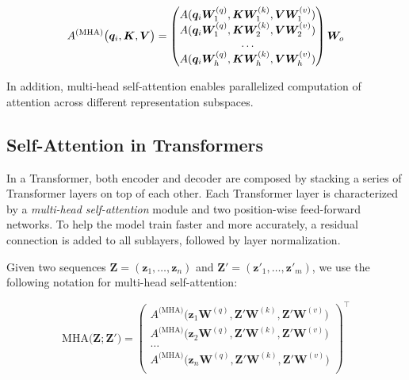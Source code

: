\begin{equation}
    A^{\textrm{(MHA)}}\bigl(\bm{q}_i, \bm{K}, \bm{V}\bigr) = 
    \begin{pmatrix}
        A(\bm{q}_i \bm{W}^{(q)}_1, \bm{K}\bm{W}^{(k)}_1, \bm{V}\bm{W}^{(v)}_1) \\
        A(\bm{q}_i \bm{W}^{(q)}_1, \bm{K}\bm{W}^{(k)}_2, \bm{V}\bm{W}^{(v)}_2) \\
        \ldots \\
        A(\bm{q}_i \bm{W}^{(q)}_h, \bm{K}\bm{W}^{(k)}_h, \bm{V}\bm{W}^{(v)}_h)
    \end{pmatrix}
    \bm{W}_o \\
\end{equation}
    

\noindent In addition, multi-head self-attention enables parallelized computation of attention across different representation subspaces.

 
\subsection{Self-Attention in Transformers}

In a Transformer, both encoder and decoder are composed by stacking a series of Transformer layers on top of each other. Each Transformer layer is characterized by a \textit{multi-head self-attention} module and two position-wise feed-forward networks. To help the model train faster and more accurately, a residual connection \citep{he2016deep} is added to all sublayers, followed by layer normalization.

Given two sequences $\bm{Z} = (\bm{z}_1, \ldots, \bm{z}_n)$ and $\bm{Z'} = (\bm{z'}_1, \ldots, \bm{z'}_m)$, we use the following notation for multi-head self-attention:

\begin{equation}
    \textrm{MHA}\bigl(\bm{Z}; \bm{Z'}\bigr) = 
    {\begin{pmatrix}
    A^{\textrm{(MHA)}}\bigl(\bm{z}_1 \bm{W}^{(q)}, \bm{Z'}\bm{W}^{(k)}, \bm{Z}'\bm{W}^{(v)}\bigr)\\ 
    A^{\textrm{(MHA)}}\bigl(\bm{z}_2 \bm{W}^{(q)}, \bm{Z'}\bm{W}^{(k)}, \bm{Z}'\bm{W}^{(v)}\bigr)\\ 
    \ldots \\
    A^{\textrm{(MHA)}}\bigl(\bm{z}_n \bm{W}^{(q)}, \bm{Z'}\bm{W}^{(k)}, \bm{Z}'\bm{W}^{(v)}\bigr) \\
    \end{pmatrix}}^{\top}
\end{equation}

